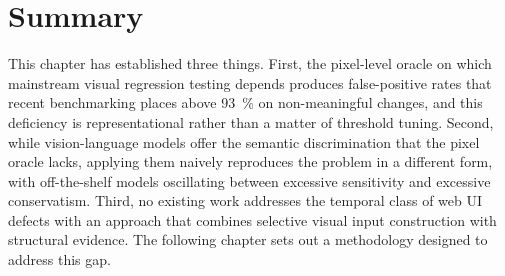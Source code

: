 \section{Summary}
\label{sec:lit-summary}

This chapter has established three things. First, the pixel-level oracle
on which mainstream visual regression testing depends produces
false-positive rates that recent benchmarking places above
\SI{93}{\percent} on non-meaningful changes, and this deficiency is
representational rather than a matter of threshold tuning. Second, while
vision-language models offer the semantic discrimination that the pixel
oracle lacks, applying them naively reproduces the problem in a different
form, with off-the-shelf models oscillating between excessive sensitivity
and excessive conservatism. Third, no existing work addresses the
temporal class of web UI defects with an approach that combines selective
visual input construction with structural evidence. The following chapter
sets out a methodology designed to address this gap.